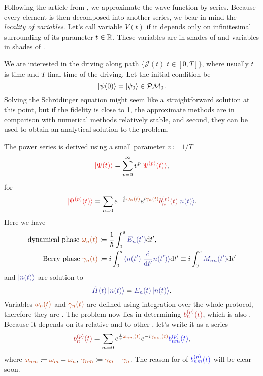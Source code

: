 Following the article from \cite{Rigolin2008}, we approximate the wave-function by series. Because every element is then decomposed into another series, we bear in mind the \emph{locality of variables}. Let's call variable $V(t)$ \emph{} if it depends only on infinitesimal surrounding of its parameter $t\in\mathbb{R}$. These variables are in shades of  and  variables in shades of .

We are interested in the driving along path $\{\mathcal J(t)|t\in[0,T]\}$, where usually $t$ is time and $T$ final time of the driving. Let the initial condition be
\begin{equation}
    \ket{\psi(0)}=\ket{\psi_0}\in \mathcal{P}\mathcal{M}_0.
\end{equation}
Solving the Schr\"odinger equation might seem like a straightforward solution at this point, but if the fidelity is close to 1, the approximate methods are in comparison with numerical methods relatively stable, and second, they can be used to obtain an analytical solution to the problem.

The power series is derived using a small parameter $v\coloneqq 1/T$
\begin{equation}
    \red{\ket{\Psi(t)}}=\sum_{p=0}^\infty v^p \red{\ket{\Psi^{(p)}(t)}},
    \label{eq:mainSeries}
\end{equation}
for 
\begin{equation}
    \red{\ket{\Psi^{(p)}(t)}}=\sum_{n=0} e^{-\frac{i}{v} \reddd{\omega_n(t)}}e^{i\reddd{\gamma_n(t)}}\redd{b_n^{(p)}(t)}\bluee{\ket{n(t)}}.
\end{equation}
Here we have
\begin{align}
    \text{dynamical phase }\reddd{\omega_n(t)} &\coloneqq \frac{1}{\hbar}\int_0^s \bluee{E_n(t')}\d t',\\
    \text{Berry phase }\reddd{\gamma_n(t)} &\coloneqq i\int_0^s \bluee{\braket{n(t')|\frac{\d}{\d t'}n(t')}}\d t' \equiv i\int_0^s \bluee{M_{nn}(t')}\d t'
    \label{eq:gammadef}
\end{align}
and $\bluee{\ket{n(t)}}$ are solution to
\begin{equation}
    \bluee{\HH(t)\ket{n(t)}}=\bluee{E_n(t) \ket{n(t)}}.
\end{equation}
Variables $\reddd{\omega_n(t)}$ and $\reddd{\gamma_n(t)}$ are defined using integration over the whole protocol, therefore they are \emph{}.
The problem now lies in determining $\redd{b_n^{(p)}(t)}$, which is also . Because it depends on its relative  and  to other , let's write it as a series
\begin{equation}
    \redd{b_n^{(p)}(t)}=\sum_{m=0} e^{\frac{i}{v}\reddd{\omega_{nm}(t)}}e^{-i\reddd{\gamma_{nm}(t)}}\blue{b_{nm}^{(p)}(t)},
    \label{eq:bnAPT}
\end{equation}
where $\reddd{\omega_{nm}} \coloneqq \reddd{\omega_m}-\reddd{\omega_n}$, $\reddd{\gamma_{nm}} \coloneqq \reddd{\gamma_m}-\reddd{\gamma_n}$.  The reason for  of $\blue{b_{nm}^{(p)}(t)}$ will be clear soon.

